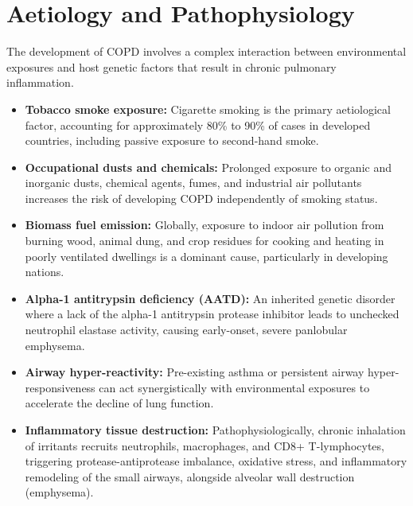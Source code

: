 \section*{Aetiology and Pathophysiology}
The development of COPD involves a complex interaction between environmental exposures and host genetic factors that result in chronic pulmonary inflammation.
\begin{itemize}
    \item \textbf{Tobacco smoke exposure:} Cigarette smoking is the primary aetiological factor, accounting for approximately 80\% to 90\% of cases in developed countries, including passive exposure to second-hand smoke.
    \item \textbf{Occupational dusts and chemicals:} Prolonged exposure to organic and inorganic dusts, chemical agents, fumes, and industrial air pollutants increases the risk of developing COPD independently of smoking status.
    \item \textbf{Biomass fuel emission:} Globally, exposure to indoor air pollution from burning wood, animal dung, and crop residues for cooking and heating in poorly ventilated dwellings is a dominant cause, particularly in developing nations.
    \item \textbf{Alpha-1 antitrypsin deficiency (AATD):} An inherited genetic disorder where a lack of the alpha-1 antitrypsin protease inhibitor leads to unchecked neutrophil elastase activity, causing early-onset, severe panlobular emphysema.
    \item \textbf{Airway hyper-reactivity:} Pre-existing asthma or persistent airway hyper-responsiveness can act synergistically with environmental exposures to accelerate the decline of lung function.
    \item \textbf{Inflammatory tissue destruction:} Pathophysiologically, chronic inhalation of irritants recruits neutrophils, macrophages, and CD8+ T-lymphocytes, triggering protease-antiprotease imbalance, oxidative stress, and inflammatory remodeling of the small airways, alongside alveolar wall destruction (emphysema).
\end{itemize}

